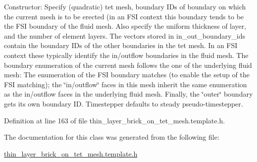 Constructor\+: Specify (quadratic) tet mesh, boundary I\+Ds of boundary on which the current mesh is to be erected (in an F\+SI context this boundary tends to be the F\+SI boundary of the fluid mesh. Also specify the uniform thickness of layer, and the number of element layers. The vectors stored in in\+\_\+out\+\_\+boundary\+\_\+ids contain the boundary I\+Ds of the other boundaries in the tet mesh. In an F\+SI context these typically identify the in/outflow boundaries in the fluid mesh. The boundary enumeration of the current mesh follows the one of the underlying fluid mesh\+: The enumeration of the F\+SI boundary matches (to enable the setup of the F\+SI matching); the \char`\"{}in/outflow\char`\"{} faces in this mesh inherit the same enumeration as the in/outflow faces in the underlying fluid mesh. Finally, the \char`\"{}outer\char`\"{} boundary gets its own boundary ID. Timestepper defaults to steady pseudo-\/timestepper. 



Definition at line 163 of file thin\+\_\+layer\+\_\+brick\+\_\+on\+\_\+tet\+\_\+mesh.\+template.\+h.



The documentation for this class was generated from the following file\+:\begin{DoxyCompactItemize}
\item 
\hyperlink{thin__layer__brick__on__tet__mesh_8template_8h}{thin\+\_\+layer\+\_\+brick\+\_\+on\+\_\+tet\+\_\+mesh.\+template.\+h}\end{DoxyCompactItemize}
